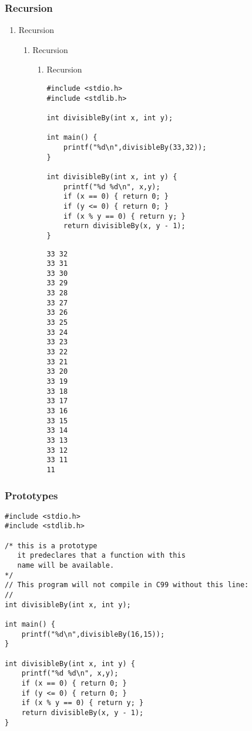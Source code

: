 \documentclass[11pt]{article}
\begin{document}
\subsubsection{Recursion}
\label{sec:orgd3ea940}
\begin{enumerate}
\item Recursion
\label{sec:org73fda68}
\begin{enumerate}
\item Recursion
\label{sec:org1d7db1a}
\begin{enumerate}
\item Recursion
\label{sec:org643393a}

\begin{verbatim}
#include <stdio.h>
#include <stdlib.h>

int divisibleBy(int x, int y);

int main() {
    printf("%d\n",divisibleBy(33,32));
}

int divisibleBy(int x, int y) {
    printf("%d %d\n", x,y);
    if (x == 0) { return 0; }
    if (y <= 0) { return 0; }
    if (x % y == 0) { return y; }
    return divisibleBy(x, y - 1);
}
\end{verbatim}


\begin{verbatim}
33 32
33 31
33 30
33 29
33 28
33 27
33 26
33 25
33 24
33 23
33 22
33 21
33 20
33 19
33 18
33 17
33 16
33 15
33 14
33 13
33 12
33 11
11
\end{verbatim}
\end{enumerate}
\end{enumerate}
\end{enumerate}


\subsubsection{Prototypes}
\label{sec:org7869f02}

\begin{verbatim}
#include <stdio.h>
#include <stdlib.h>

/* this is a prototype
   it predeclares that a function with this
   name will be available.
*/
// This program will not compile in C99 without this line:
// 
int divisibleBy(int x, int y);

int main() {
    printf("%d\n",divisibleBy(16,15));
}

int divisibleBy(int x, int y) {
    printf("%d %d\n", x,y);
    if (x == 0) { return 0; }
    if (y <= 0) { return 0; }
    if (x % y == 0) { return y; }
    return divisibleBy(x, y - 1);
}


\end{verbatim}
\end{document}
